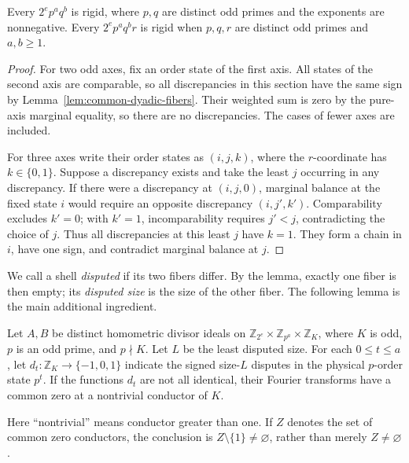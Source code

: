 \begin{corollary}
\label{cor:two-odd-axes}
Every \(2^ep^aq^b\) is rigid, where \(p,q\) are distinct odd primes
and the exponents are nonnegative. Every \(2^ep^aq^br\) is rigid
when \(p,q,r\) are distinct odd primes and \(a,b\ge1\).
\end{corollary}

\begin{proof}
For two odd axes, fix an order state of the first axis. All states of
the second axis are comparable, so all discrepancies in this section
have the same sign by Lemma~\ref{lem:common-dyadic-fibers}. Their
weighted sum is zero by the pure-axis marginal equality, so there are
no discrepancies. The cases of fewer axes are included.

For three axes write their order states as \((i,j,k)\), where the
\(r\)-coordinate has \(k\in\{0,1\}\). Suppose a discrepancy exists
and take the least \(j\) occurring in any discrepancy. If there were
a discrepancy at \((i,j,0)\), marginal balance at the fixed state
\(i\) would require an opposite discrepancy \((i,j',k')\).
Comparability excludes \(k'=0\); with \(k'=1\), incomparability
requires \(j'<j\), contradicting the choice of \(j\). Thus all
discrepancies at this least \(j\) have \(k=1\). They form a chain
in \(i\), have one sign, and contradict marginal balance at \(j\).
\end{proof}

We call a shell \emph{disputed} if its two fibers differ. By the lemma,
exactly one fiber is then empty; its \emph{disputed size} is the size
of the other fiber. The following lemma is the main additional ingredient.

\begin{lemma}
\label{lem:primary-common-zero}
Let \(A,B\) be distinct homometric divisor ideals on
\(\mathbb Z_{2^e}\times\mathbb Z_{p^a}\times\mathbb Z_K\), where
\(K\) is odd, \(p\) is an odd prime, and \(p\nmid K\). Let \(L\)
be the least disputed size. For each \(0\le t\le a\), let
\(d_t:\mathbb Z_K\to\{-1,0,1\}\) indicate the signed size-\(L\)
disputes in the physical \(p\)-order state \(p^t\). If the functions
\(d_t\) are not all identical, their Fourier transforms have a common
zero at a nontrivial conductor of \(K\).
\end{lemma}

Here ``nontrivial'' means conductor greater than one. If \(Z\) denotes
the set of common zero conductors, the conclusion is
\(Z\setminus\{1\}\ne\varnothing\), rather than merely
\(Z\ne\varnothing\).

